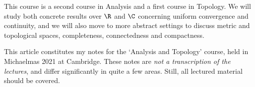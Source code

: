 



This course is a second course in Analysis and a first course in Topology. 
We will study both concrete results over $\R$ and $\C$ concerning uniform convergence and continuity, and we will also move to more abstract settings to discuss metric and topological spaces, completeness, connectedness and compactness.

This article constitutes my notes for the `Analysis and Topology' course, held in Michaelmas 2021 at Cambridge. These notes are \emph{not a transcription of the lectures}, and differ significantly in quite a few areas. Still, all lectured material should be covered.












